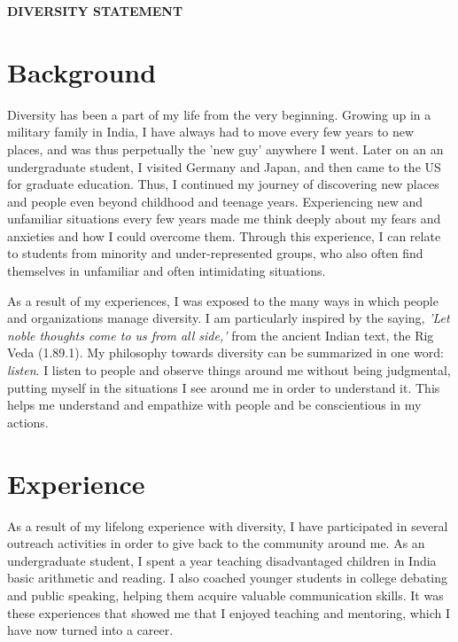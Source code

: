 \documentclass[12pt]{article}
\begin{document}
 \sloppy %
\begin{center}
{\large \uppercase{\textbf{Diversity Statement}}}
\end{center}

\section*{Background}
Diversity has been a part of my life from the very beginning. Growing up in a military family in India, I have always had to move every few years to new places, and was thus perpetually the 'new guy' anywhere I went. Later on an an undergraduate student, I visited Germany and Japan, and then came to the US for graduate education. Thus, I continued my journey of discovering new places and people even beyond childhood and teenage years. Experiencing new and unfamiliar situations every few years made me think deeply about my fears and anxieties and how I could overcome them. Through this experience, I can relate to students from minority and under-represented groups, who also often find themselves in unfamiliar and often intimidating situations. 

As a result of my experiences, I was exposed to the many ways in which people and organizations manage diversity. I am particularly inspired by the saying, \textit{'Let noble thoughts come to us from all side,'} from the ancient Indian text, the Rig Veda (1.89.1). My philosophy towards diversity can be summarized in one word: \textit{listen}. I listen to people and observe things around me without being judgmental, putting myself in the situations I see around me in order to understand it. This helps me understand and empathize with people and be conscientious in my actions.

\section*{Experience}
As a result of my lifelong experience with diversity, I have participated in several outreach activities in order to give back to the community around me. As an undergraduate student, I spent a year teaching disadvantaged children in India basic arithmetic and reading. I also coached younger students in college debating and public speaking, helping them acquire valuable communication skills. It was these experiences that showed me that I enjoyed teaching and mentoring, which I have now turned into a career.
\end{document}
